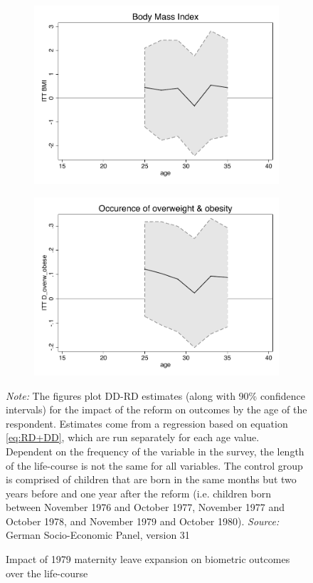 \documentclass[a4paper ]{article}
\begin{document}
\begin{figure}[p]
\begin{subfigure}[h]{0.48\textwidth}\centering
	\includegraphics[width=\textwidth]{../../analysis/graphs/SOEP/BMI_LC.pdf}
\end{subfigure}
\quad
\begin{subfigure}[h]{0.48\textwidth}\centering
	\includegraphics[width=\textwidth]{../../analysis/graphs/SOEP/D_overw_obese_LC.pdf}
\end{subfigure}
\caption{Impact of 1979 maternity leave expansion on biometric outcomes over the life-course}\label{fig: LC_BM}
\begin{minipage}{\textwidth} %
{\footnotesize \textit{Note:} The figures plot DD-RD estimates (along with 90\% confidence intervals) for the impact of the reform on outcomes by the age of the respondent. Estimates come from a regression based on equation \ref{eq:RD+DD}, which are run separately for each age value. Dependent on the frequency of the variable in the survey, the length of the life-course is not the same for all variables. The control group is comprised of children that are born in the same months but two years before and one year after the reform (i.e. children born between November 1976 and October 1977, November 1977 and October 1978, and November 1979 and October 1980).  \newline \textit{Source: }German Socio-Economic Panel, version 31\par}

\end{minipage}
\end{figure}
\end{document}
